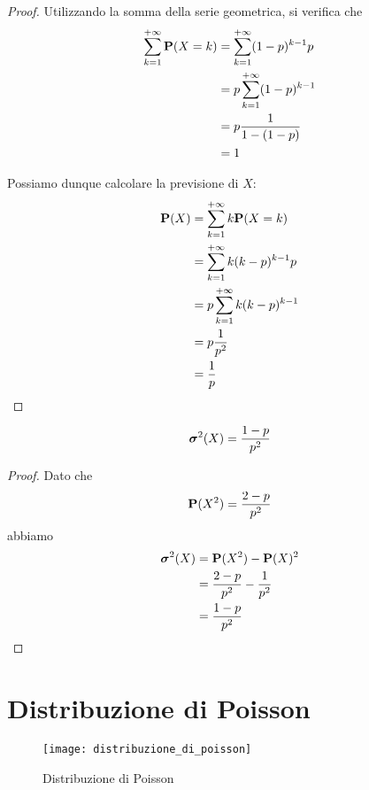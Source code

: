 \begin{proof}
  Utilizzando la somma della serie geometrica, si verifica che
  \begin{align*}
    \sum_{k=1}^{+ \infty} \mathbf{P}(X = k) &= \sum_{k=1}^{+ \infty} (1-p)^{k-1} p \\
    &= p \sum_{k=1}^{+ \infty} (1-p)^{k-1}  \\
    &= p \frac{1}{1-(1-p)} \\
    &= 1
  \end{align*}

  Possiamo dunque calcolare la previsione di \( X \):
  \begin{align*}
    \pr(X) &= \sum_{k=1}^{+ \infty} k \pr(X = k) \\ %
    &= \sum_{k=1}^{+ \infty} k (k - p)^{k-1} p \\
    &= p \sum_{k=1}^{+ \infty} k (k - p)^{k-1} \\
    &= p \frac{1}{p^2} \\
    &= \frac{1}{p}
  \end{align*}
\end{proof}

\begin{proposition}
  \[ \boldsymbol\sigma^2(X) = \frac{1-p}{p^2} \]
\end{proposition}

\begin{proof}
  Dato che
  \[ \mathbf{P}(X^2) = \frac{2-p}{p^2} \] %
  abbiamo
  \begin{align*}
    \boldsymbol\sigma^2(X) &= \mathbf{P}(X^2) - \mathbf{P}(X)^2 \\
    &= \frac{2-p}{p^2} - \frac{1}{p^2} \\
    &= \frac{1-p}{p^2}
  \end{align*}
\end{proof}


\section{Distribuzione di Poisson} %
\begin{figure*}
  \texttt{[image: distribuzione\_di\_poisson]}
  \caption{Distribuzione di Poisson}
\end{figure*}

